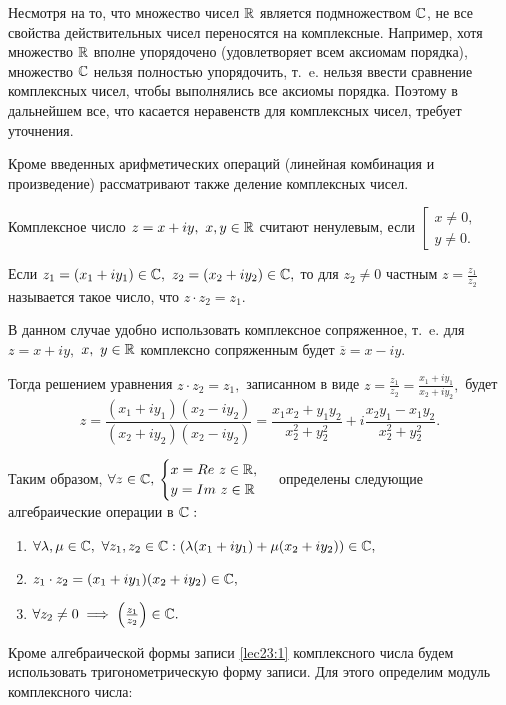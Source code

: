 \documentclass[../../main.tex]{subfiles}
\begin{document}
	Несмотря на то, что множество чисел $\mathbb{R}$ является подмножеством $\mathbb{C}$, не все
	свойства действительных чисел переносятся на комплексные. Например, хотя
	множество $\mathbb{R}$ вполне упорядочено (удовлетворяет всем аксиомам порядка),
	множество $\mathbb{C}$ нельзя полностью упорядочить, т.~e. нельзя ввести сравнение
	комплексных чисел, чтобы выполнялись все аксиомы порядка. Поэтому в 
	дальнейшем все, что касается неравенств для комплексных чисел, требует
	уточнения.
	
	Кроме введенных арифметических операций (линейная комбинация и произведение)
	рассматривают также деление комплексных чисел.
	
	Комплексное число $z = x + iy,\ x, y\in\mathbb{R}$ считают ненулевым, если 
	$\left[
	\begin{gathered} 
		x \neq  0, \\
		y \neq  0. 
	\end{gathered} \right.$
	
	Если $z_1 = (x_1 + iy_1)\in \mathbb{C},\ z_2 = (x_2 + iy_2)\in\mathbb{C},$ то для 
	$z_2 \neq 0$ частным $z = \frac{z_1}{z_2}$ называется такое число,
	что $z\cdot z_2 = z_1.$
	
	В данном случае удобно использовать комплексное сопряженное, т.~e. для
	$z = x +iy,$ $x,\ y\in\mathbb{R}$ комплексно сопряженным будет 
	$\overline{z} = x - iy.$
	
	Тогда решением уравнения $z\cdot z_2 = z_1,$ записанном в виде 
	$z = \frac{z_1}{z_2} = \frac{x_1 + iy_1}{x_2 + iy_2},$ будет
	\[z = \frac{(x_1 + iy_1)(x_2 - iy_2)}{(x_2 + iy_2)(x_2 - iy_2)} =
	\frac{x_1x_2+y_1y_2}{x_2^2 + y_2^2} + i  
	\frac{x_2y_1-x_1y_2}{x_2^2 + y_2^2}.\]
	
	Таким образом, $\forall z\in \mathbb{C},$ 
	$\begin{cases} 
	x = Re\ z \in \mathbb{R},\\
	 y = Im\ z \in \mathbb{R}
	\end{cases}$ определены следующие алгебраические операции в $\mathbb{C}:$
	\begin{enumerate}
		\item $\forall \lambda, \mu\in\mathbb{C},\ \forall z_1, z_2\in\mathbb{C}:
		(\lambda(x_1+iy_1)+\mu(x_2+iy_2)) \in\mathbb{C},$
		\item $z_1\cdot z_2 = (x_1+iy_1)(x_2+iy_2) \in\mathbb{C},$
		\item $\forall z_2 \neq 0 \implies \left(\frac{z_1}{z_2}\right)
		\in \mathbb{C}.$
	\end{enumerate}
	
	Кроме алгебраической формы записи \eqref{lec23:1} комплексного числа будем
	использовать тригонометрическую форму записи. Для этого определим модуль 
	комплексного числа:
	
\end{document}
